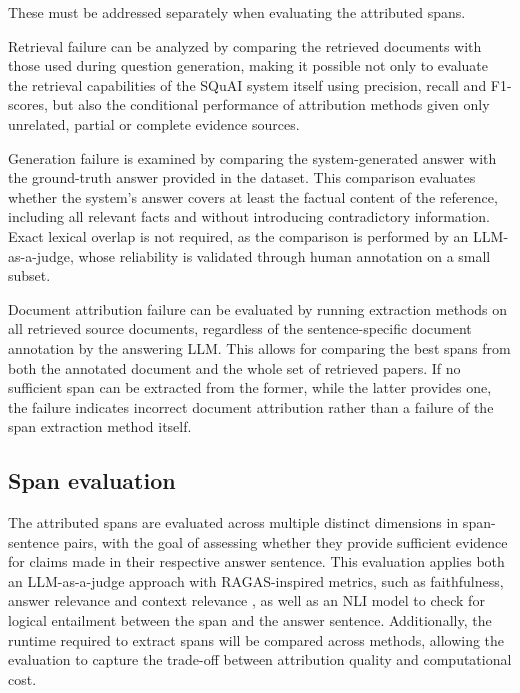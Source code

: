 These must be addressed separately when evaluating the attributed spans. 

Retrieval failure can be analyzed by comparing the retrieved documents with those used during question generation, making it possible not only to evaluate the retrieval capabilities of the SQuAI system itself using precision, recall and F1-scores, but also the conditional performance of attribution methods given only unrelated, partial or complete evidence sources.

Generation failure is examined by comparing the system-generated answer with the ground-truth answer provided in the dataset. This comparison evaluates whether the system's answer covers at least the factual content of the reference, including all relevant facts and without introducing contradictory information. Exact lexical overlap is not required, as the comparison is performed by an LLM-as-a-judge, whose reliability is validated through human annotation on a small subset.

Document attribution failure can be evaluated by running extraction methods on all retrieved source documents, regardless of the sentence-specific document annotation by the answering LLM. This allows for comparing the best spans from both the annotated document and the whole set of retrieved papers. If no sufficient span can be extracted from the former, while the latter provides one, the failure indicates incorrect document attribution rather than a failure of the span extraction method itself. 

\subsection{Span evaluation}
The attributed spans are evaluated across multiple distinct dimensions in span-sentence pairs, with the goal of assessing whether they provide sufficient evidence for claims made in their respective answer sentence. This evaluation applies both an LLM-as-a-judge approach with RAGAS-inspired metrics, such as faithfulness, answer relevance and context relevance \cite{ragas}, as well as an NLI model to check for logical entailment between the span and the answer sentence.
Additionally, the runtime required to extract spans will be compared across methods, allowing the evaluation to capture the trade-off between attribution quality and computational cost.



